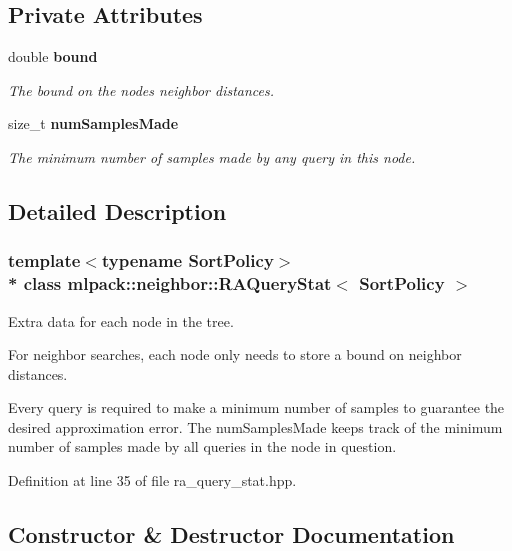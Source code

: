 \subsection*{Private Attributes}
\begin{DoxyCompactItemize}
\item 
double {\bf bound}
\begin{DoxyCompactList}\small\item\em The bound on the node\textquotesingle{}s neighbor distances. \end{DoxyCompactList}\item 
size\+\_\+t {\bf num\+Samples\+Made}
\begin{DoxyCompactList}\small\item\em The minimum number of samples made by any query in this node. \end{DoxyCompactList}\end{DoxyCompactItemize}


\subsection{Detailed Description}
\subsubsection*{template$<$typename Sort\+Policy$>$\\*
class mlpack\+::neighbor\+::\+R\+A\+Query\+Stat$<$ Sort\+Policy $>$}

Extra data for each node in the tree. 

For neighbor searches, each node only needs to store a bound on neighbor distances.

Every query is required to make a minimum number of samples to guarantee the desired approximation error. The \textquotesingle{}num\+Samples\+Made\textquotesingle{} keeps track of the minimum number of samples made by all queries in the node in question. 

Definition at line 35 of file ra\+\_\+query\+\_\+stat.\+hpp.



\subsection{Constructor \& Destructor Documentation}

